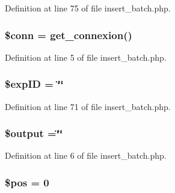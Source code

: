 Definition at line 75 of file insert\-\_\-batch.\-php.

\hypertarget{insert__batch_8php_aa8a5a87b9c1a6a0819b88447cbe41877}{
\subsubsection[{\$conn}]{\setlength{\rightskip}{0pt plus 5cm}\$conn = {\bf get\-\_\-connexion}()}}\label{insert__batch_8php_aa8a5a87b9c1a6a0819b88447cbe41877}


Definition at line 5 of file insert\-\_\-batch.\-php.

\hypertarget{insert__batch_8php_ae384d32e62e85e587cd27bf249ed3db3}{
\subsubsection[{\$exp\-I\-D}]{\setlength{\rightskip}{0pt plus 5cm}\${\bf exp\-I\-D} = \char`\"{}\char`\"{}}}\label{insert__batch_8php_ae384d32e62e85e587cd27bf249ed3db3}


Definition at line 71 of file insert\-\_\-batch.\-php.

\hypertarget{insert__batch_8php_a73004ce9cd673c1bfafd1dc351134797}{
\subsubsection[{\$output}]{\setlength{\rightskip}{0pt plus 5cm}\$output =\char`\"{}\char`\"{}}}\label{insert__batch_8php_a73004ce9cd673c1bfafd1dc351134797}


Definition at line 6 of file insert\-\_\-batch.\-php.

\hypertarget{insert__batch_8php_a5de51f0c80b3bb3b39a57b23f6b9ea9f}{
\subsubsection[{\$pos}]{\setlength{\rightskip}{0pt plus 5cm}\$pos = 0}}\label{insert__batch_8php_a5de51f0c80b3bb3b39a57b23f6b9ea9f}


